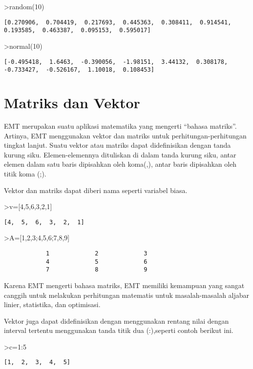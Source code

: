 \documentclass[
]{book}
\begin{document}
\textgreater random(10)

\begin{verbatim}
[0.270906,  0.704419,  0.217693,  0.445363,  0.308411,  0.914541,
0.193585,  0.463387,  0.095153,  0.595017]
\end{verbatim}

\textgreater normal(10)

\begin{verbatim}
[-0.495418,  1.6463,  -0.390056,  -1.98151,  3.44132,  0.308178,
-0.733427,  -0.526167,  1.10018,  0.108453]
\end{verbatim}

\chapter{Matriks dan Vektor}\label{matriks-dan-vektor}

EMT merupakan suatu aplikasi matematika yang mengerti ``bahasa matriks''. Artinya, EMT menggunakan vektor dan matriks untuk perhitungan-perhitungan tingkat lanjut. Suatu vektor atau matriks dapat didefinisikan dengan tanda kurung siku. Elemen-elemennya dituliskan di dalam tanda kurung siku, antar elemen dalam satu baris dipisahkan oleh koma(,), antar baris dipisahkan oleh titik koma (;).

Vektor dan matriks dapat diberi nama seperti variabel biasa.

\textgreater v={[}4,5,6,3,2,1{]}

\begin{verbatim}
[4,  5,  6,  3,  2,  1]
\end{verbatim}

\textgreater A={[}1,2,3;4,5,6;7,8,9{]}

\begin{verbatim}
            1             2             3 
            4             5             6 
            7             8             9 
\end{verbatim}

Karena EMT mengerti bahasa matriks, EMT memiliki kemampuan yang sangat canggih untuk melakukan perhitungan matematis untuk masalah-masalah aljabar linier, statistika, dan optimisasi.

Vektor juga dapat didefinisikan dengan menggunakan rentang nilai dengan interval tertentu menggunakan tanda titik dua (:),seperti contoh berikut ini.

\textgreater c=1:5

\begin{verbatim}
[1,  2,  3,  4,  5]
\end{verbatim}
\end{document}
